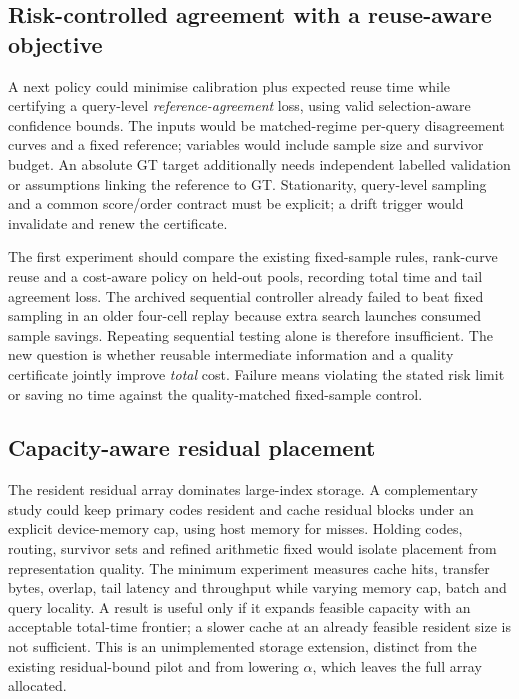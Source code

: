 \subsection{Risk-controlled agreement with a reuse-aware objective}

A next policy could minimise calibration plus expected reuse time while
certifying a query-level \emph{reference-agreement} loss, using valid
selection-aware confidence bounds. The inputs would be matched-regime
per-query disagreement curves and a fixed reference; variables would include
sample size and survivor budget. An absolute GT target additionally needs
independent labelled validation or assumptions linking the reference to GT.
Stationarity, query-level sampling and a common score/order contract must
be explicit; a drift trigger would invalidate and renew the certificate.

The first experiment should compare the existing fixed-sample rules,
rank-curve reuse and a cost-aware policy on held-out pools, recording total
time and tail agreement loss. The archived sequential controller already
failed to beat fixed sampling in an older four-cell replay because extra
search launches consumed sample savings. Repeating sequential testing alone
is therefore insufficient. The new question is whether reusable intermediate
information and a quality certificate jointly improve \emph{total} cost.
Failure means violating the stated risk limit or saving no time against the
quality-matched fixed-sample control.

\subsection{Capacity-aware residual placement}

The resident residual array dominates large-index storage. A complementary
study could keep primary codes resident and cache residual blocks under an
explicit device-memory cap, using host memory for misses. Holding codes,
routing, survivor sets and refined arithmetic fixed would isolate placement
from representation quality. The minimum experiment measures cache hits,
transfer bytes, overlap, tail latency and throughput while varying memory
cap, batch and query locality. A result is useful only if it expands feasible
capacity with an acceptable total-time frontier; a slower cache at an already
feasible resident size is not sufficient. This is an unimplemented storage
extension, distinct from the existing residual-bound pilot and from lowering
$\alpha$, which leaves the full array allocated.
